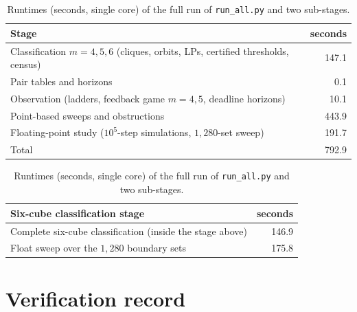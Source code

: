 \documentclass[11pt,a4paper]{article}
\theoremstyle{plain}
\theoremstyle{definition}
\theoremstyle{remark}
\begin{document}
\begin{table}[H]\centering\small
\caption{Runtimes (seconds, single core) of the full run of \texttt{run\_all.py} and two sub-stages.}\label{tab:S7rt}
\begin{tabular}{lr}
\toprule
Stage & seconds\\
\midrule
Classification $m=4,5,6$ (cliques, orbits, LPs, certified thresholds, census) & 147.1\\
Pair tables and horizons & 0.1\\
Observation (ladders, feedback game $m=4,5$, deadline horizons) & 10.1\\
Point-based sweeps and obstructions & 443.9\\
Floating-point study ($10^5$-step simulations, $1{,}280$-set sweep) & 191.7\\
Total & 792.9\\
\bottomrule
\end{tabular}
\qquad\begin{tabular}{lr}
\toprule
Six-cube classification stage & seconds\\
\midrule
Complete six-cube classification (inside the stage above) & 146.9\\
Float sweep over the $1{,}280$ boundary sets & 175.8\\
\bottomrule
\end{tabular}
\end{table}
\section{Verification record}\label{S:verif}
\end{document}

